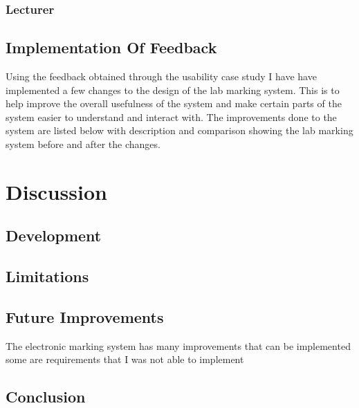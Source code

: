 \documentclass[12pt]{article}  %
\begin{document}
\subsubsection*{Lecturer}

\subsection{Implementation Of Feedback}

Using the feedback obtained through the usability case study I have have implemented a few changes to the design of the lab marking system. This is to help improve the overall usefulness of the system and make certain parts of the system easier to understand and interact with. The improvements done to the system are listed below with description and comparison showing the lab marking system before and after the changes.   


\newpage
\section{Discussion}

\subsection{Development}

\subsection{Limitations}

\subsection{Future Improvements}
The electronic marking system has many improvements that can be implemented some are requirements that I was not able to implement 

\subsection{Conclusion}









\end{document}
